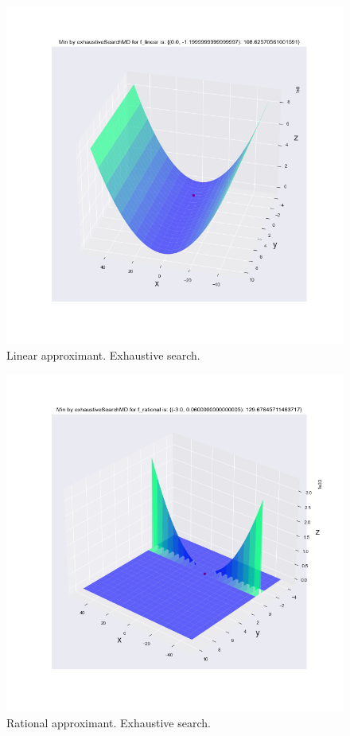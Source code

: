 \documentclass[a4paper,article,14pt]{extarticle}
\begin{document}
	\begin{figure}[h]
		\centering
		\includegraphics[scale=0.5]{f_linear_exhaustiveSearchMD.png}
		\caption{Linear approximant. Exhaustive search.}
		\label{linearEx}
	\end{figure} 
	\begin{figure}[h]
		\centering
		\includegraphics[scale=0.5]{f_rational_exhaustiveSearchMD.png}
		\caption{Rational approximant. Exhaustive search.}
		\label{rationalEx}
	\end{figure}
\end{document}
